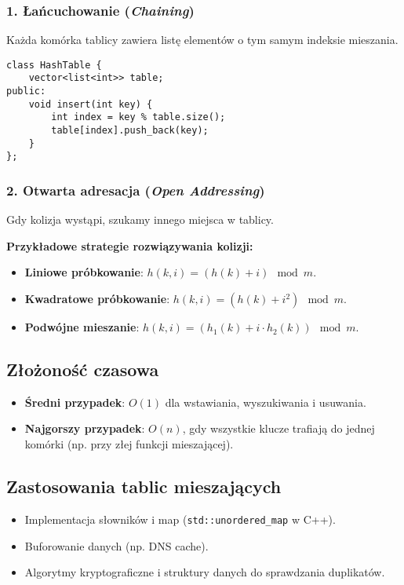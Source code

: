 \subsubsection{1. Łańcuchowanie (\textit{Chaining})}
Każda komórka tablicy zawiera listę elementów o tym samym indeksie mieszania.
\begin{verbatim}
class HashTable {
    vector<list<int>> table;
public:
    void insert(int key) {
        int index = key % table.size();
        table[index].push_back(key);
    }
};
\end{verbatim}

\subsubsection{2. Otwarta adresacja (\textit{Open Addressing})}
Gdy kolizja wystąpi, szukamy innego miejsca w tablicy.

\textbf{Przykładowe strategie rozwiązywania kolizji:}
\begin{itemize}
    \item \textbf{Liniowe próbkowanie}: \( h(k, i) = (h(k) + i) \mod m \).
    \item \textbf{Kwadratowe próbkowanie}: \( h(k, i) = (h(k) + i^2) \mod m \).
    \item \textbf{Podwójne mieszanie}: \( h(k, i) = (h_1(k) + i \cdot h_2(k)) \mod m \).
\end{itemize}

\subsection{Złożoność czasowa}
\begin{itemize}
    \item \textbf{Średni przypadek}: \( O(1) \) dla wstawiania, wyszukiwania i usuwania.
    \item \textbf{Najgorszy przypadek}: \( O(n) \), gdy wszystkie klucze trafiają do jednej komórki (np. przy złej funkcji mieszającej).
\end{itemize}

\subsection{Zastosowania tablic mieszających}
\begin{itemize}
    \item Implementacja słowników i map (\texttt{std::unordered\_map} w C++).
    \item Buforowanie danych (np. DNS cache).
    \item Algorytmy kryptograficzne i struktury danych do sprawdzania duplikatów.
\end{itemize}

